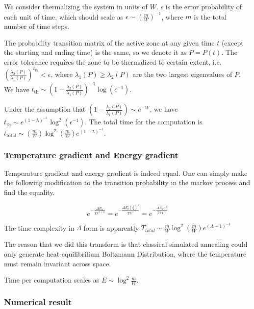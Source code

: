 \documentclass[twocolumn,superscriptaddress,english,showpacs,longbibliography]{revtex4-2}
\begin{document}
We consider thermalizing the system in units of $W$. $\epsilon$ is
the error probability of each unit of time, which should scale as
$\epsilon \sim\left(\frac{m}{W}\right)^{-1}$, where $m$ is the total
number of time steps.

The probability transition matrix of the active zone at any given time
$t$ (except the starting and ending time) is the same, so we denote it
as $P = P(t)$. The error tolerance requires the zone to be thermalized
to certain extent,
i.e.~$\left(\frac{\lambda_2(P)}{\lambda_1(P)}\right)^{t_{\text{th}}} < \epsilon$,
where $\lambda_1(P) \geq \lambda_2(P)$ are the two largest eigenvalues
of $P$. We have
$t_{\text{th}} \sim \left(1-\frac{\lambda_2(P)}{\lambda_1(P)}\right)^{-1}\log(\epsilon^{-1})$.

Under the assumption that
$\left(1-\frac{\lambda_2(P)}{\lambda_1(P)}\right)\sim e^{-W}$, we have
$t_{\text{th}} \sim e^{(1-\lambda)^{-1}}\log^2(\epsilon^{-1})$. The
total time for the computation is
$t_{\text{total}} \sim \left(\frac{m}{W}\right)\log^2(\frac{m}{W}) e^{(1-\lambda)^{-1}}$.

\subsubsection{Temperature gradient and Energy
gradient}\label{temperature-gradient-and-energy-gradient}

Temperature gradient and energy gradient is indeed equal. One can simply
make the following modification to the transition probability in the
markov process and find the equality.

\[e^{-\frac{\Delta E_k}{T\lambda^{ct+k}}} = e^{-\frac{\Delta E_k(\frac{1}{\lambda})^k}{T\lambda^{ct}}} = e^{-\frac{\Delta E_k \Lambda^k}{T(t)}}\]

The time complexity in $\Lambda$ form is apparently
$T_{total} \sim \frac{m}{W}\log^2(\frac{m}{W})e^{(\Lambda-1)^{-1}}$

The reason that we did this transform is that classical simulated
annealing could only generate heat-equilibrilium Boltzmann Distribution,
where the temperature must remain invariant across space.

Time per computation scales as $E \sim \log^2 \frac{m}{W}$.

\subsubsection{Numerical result}\label{numerical-result}
\end{document}
